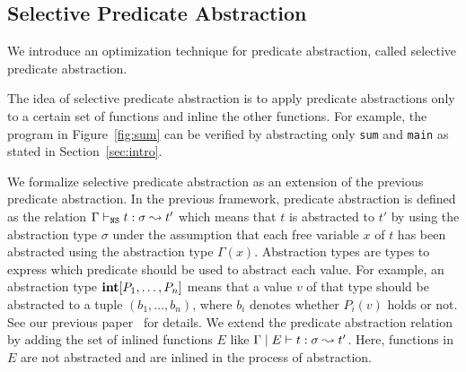 
\subsection{Selective Predicate Abstraction}

We introduce an optimization technique for predicate abstraction, called
selective predicate abstraction.

The idea of selective predicate abstraction is to apply predicate
abstractions only to a certain set of functions and inline the other
functions.  For example, the program in Figure~\ref{fig:sum} can
be verified by abstracting only \texttt{sum} and \texttt{main} as stated
in Section~\ref{sec:intro}.

We formalize selective predicate abstraction as an extension of the
previous predicate abstraction.  In the previous framework, predicate
abstraction is defined as the relation
${\Gamma} \vdash_{\texttt{NS}} {t} : {\sigma} \leadsto {t'}$ which means that $t$ is abstracted to
$t'$ by using the abstraction type $\sigma$ under the assumption that
each free variable $x$ of $t$ has been abstracted using the abstraction
type $\Gamma(x)$.  Abstraction types are types to express which
predicate should be used to abstract each value.  For example, an
abstraction type $\mathbf{int}[P_1,\dots,P_n]$ means that a value
$v$ of that type should be abstracted to a tuple $(b_1,\dots,b_n)$,
where $b_i$ denotes whether $P_i(v)$ holds or not.  See our previous
paper~\cite{KobayashiPLDI2011} for details.  We extend the predicate
abstraction relation by adding the set of inlined functions $E$ like
${\Gamma} \mid {E} \vdash {t} : {\sigma} \leadsto {t'}$.  Here, functions in $E$ are not
abstracted and are inlined in the process of abstraction.

